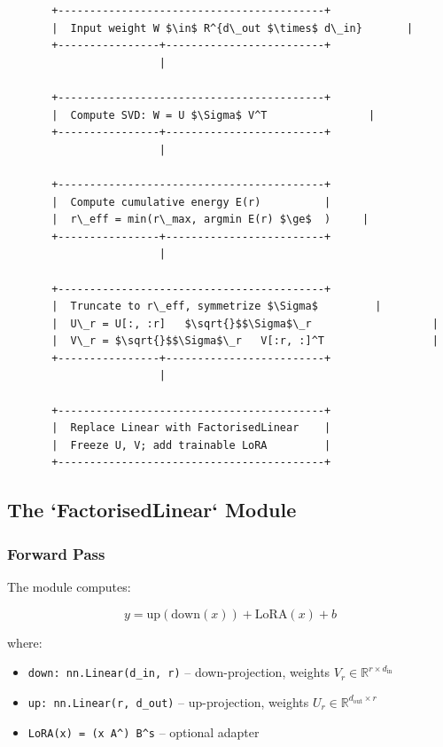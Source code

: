 \begin{lstlisting}
       +------------------------------------------+
       |  Input weight W $\in$ R^{d\_out $\times$ d\_in}       |
       +----------------+-------------------------+
                        |
                         
       +------------------------------------------+
       |  Compute SVD: W = U $\Sigma$ V^T                |
       +----------------+-------------------------+
                        |
                         
       +------------------------------------------+
       |  Compute cumulative energy E(r)          |
       |  r\_eff = min(r\_max, argmin E(r) $\ge$  )     |
       +----------------+-------------------------+
                        |
                         
       +------------------------------------------+
       |  Truncate to r\_eff, symmetrize $\Sigma$         |
       |  U\_r = U[:, :r]   $\sqrt{}$$\Sigma$\_r                   |
       |  V\_r = $\sqrt{}$$\Sigma$\_r   V[:r, :]^T                 |
       +----------------+-------------------------+
                        |
                         
       +------------------------------------------+
       |  Replace Linear with FactorisedLinear    |
       |  Freeze U, V; add trainable LoRA         |
       +------------------------------------------+
\end{lstlisting}

\subsection{The `FactorisedLinear` Module}

\subsubsection{Forward Pass}

The module computes:

\[
y = \text{up}(\text{down}(x)) + \text{LoRA}(x) + b
\tag{4.2}
\]

where:

\begin{itemize}
\item \texttt{down: nn.Linear(d\_in, r)} -- down-projection, weights $V_r \in \mathbb{R}^{r \times d_\text{in}}$
\item \texttt{up: nn.Linear(r, d\_out)} -- up-projection, weights $U_r \in \mathbb{R}^{d_\text{out} \times r}$
\item \texttt{LoRA(x) = (x A^\top) B^\top \cdot s} -- optional adapter

\end{itemize}
